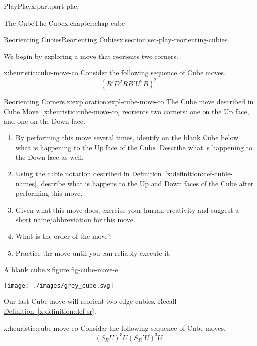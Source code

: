\documentclass[oneside,10pt,]{book}
\newcommand{\xreffont}{\relax}
\numberwithin{equation}{section}
\begin{document}
\begin{partptx}{Play}{}{Play}{}{}{x:part:part-play}
\begin{chapterptx}{The Cube}{}{The Cube}{}{}{x:chapter:chap-cube}
\begin{sectionptx}{Reorienting Cubies}{}{Reorienting Cubies}{}{}{x:section:sec-play-reorienting-cubies}
\begin{introduction}{}
\end{introduction}%
We begin by exploring a move that reorients two corners.%
\begin{heuristic}{}{}{x:heuristic:cube-move-co}%
%
Consider the following sequence of Cube moves.%
%
\begin{equation*}
(R' D^2 R B' U^2 B)^2
\end{equation*}
\end{heuristic}
\begin{exploration}{Reorienting Corners.}{x:exploration:expl-cube-move-co}%
The Cube move described in \hyperref[x:heuristic:cube-move-co]{Cube Move~{\xreffont\ref{x:heuristic:cube-move-co}}} reorients two corners: one on the Up face, and one on the Down face.%
%
\begin{enumerate}
\item{}By performing this move several times, identify on the blank Cube below what is happening to the Up face of the Cube. Describe what is happening to the Down face as well.%
\item{}Using the cubie notation described in \hyperref[x:definition:def-cubie-names]{Definition~{\xreffont\ref{x:definition:def-cubie-names}}}, describe what is happens to the Up and Down faces of the Cube after performing this move.%
\item{}Given what this move does, exercise your human creativity and suggest a short name\slash{}abbreviation for this move.%
\item{}What is the order of the move?%
\item{}Practice the move until you can reliably execute it.%
\end{enumerate}
\begin{figureptx}{A blank cube.}{x:figure:fig-cube-move-e}{}%
\begin{image}{0.25}{0.5}{0.25}%
\texttt{[image: ./images/grey\_cube.svg]}
\end{image}%
\tcblower
\end{figureptx}%
\end{exploration}%
Our last Cube move will reorient two edge cubies. Recall \hyperref[x:definition:def-sr]{Definition~{\xreffont\ref{x:definition:def-sr}}}.%
\begin{heuristic}{}{}{x:heuristic:cube-move-eo}%
%
Consider the following sequence of Cube moves.%
%
\begin{equation*}
(S_R U)^3 U (S_R ' U)^3 U
\end{equation*}

\end{heuristic}
\end{sectionptx}
\end{chapterptx}
\end{partptx}
\end{document}
